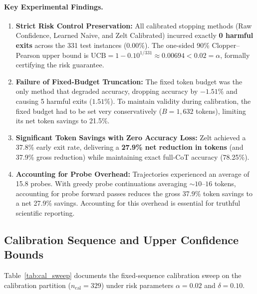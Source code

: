 \documentclass[11pt]{article}
\begin{document}
\paragraph{Key Experimental Findings.}
\begin{enumerate}
  \item \textbf{Strict Risk Control Preservation:} All calibrated stopping methods (Raw Confidence, Learned Naive, and Zelt Calibrated) incurred exactly \textbf{0 harmful exits} across the 331 test instances ($0.00\%$). The one-sided 90\% Clopper--Pearson upper bound is $\mathrm{UCB} = 1 - 0.10^{1/331} \approx 0.00694 < 0.02 = \alpha$, formally certifying the risk guarantee.
  \item \textbf{Failure of Fixed-Budget Truncation:} The fixed token budget was the only method that degraded accuracy, dropping accuracy by $-1.51\%$ and causing 5 harmful exits ($1.51\%$). To maintain validity during calibration, the fixed budget had to be set very conservatively ($B=1{,}632$ tokens), limiting its net token savings to 21.5\%.
  \item \textbf{Significant Token Savings with Zero Accuracy Loss:} Zelt achieved a 37.8\% early exit rate, delivering a \textbf{27.9\% net reduction in tokens} (and 37.9\% gross reduction) while maintaining exact full-CoT accuracy (78.25\%).
  \item \textbf{Accounting for Probe Overhead:} Trajectories experienced an average of 15.8 probes. With greedy probe continuations averaging $\sim 10$--$16$ tokens, accounting for probe forward passes reduces the gross 37.9\% token savings to a net 27.9\% savings. Accounting for this overhead is essential for truthful scientific reporting.
\end{enumerate}

\subsection{Calibration Sequence and Upper Confidence Bounds}
Table~\ref{tab:cal_sweep} documents the fixed-sequence calibration sweep on the calibration partition ($n_{\mathrm{cal}}=329$) under risk parameters $\alpha=0.02$ and $\delta=0.10$.
\end{document}
